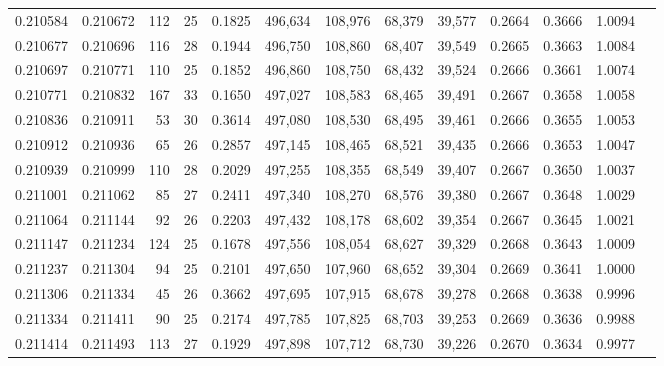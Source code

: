 \begin{tabular}{rrrrrrrrrrrrr}
0.210584 & 0.210672 & 112 &  25 &                                     0.1825 & 496,634 & 108,976 &  68,379 &  39,577 & 0.2664 & 0.3666 & 1.0094 \\
0.210677 & 0.210696 & 116 &  28 &                                     0.1944 & 496,750 & 108,860 &  68,407 &  39,549 & 0.2665 & 0.3663 & 1.0084 \\
0.210697 & 0.210771 & 110 &  25 &                                     0.1852 & 496,860 & 108,750 &  68,432 &  39,524 & 0.2666 & 0.3661 & 1.0074 \\
0.210771 & 0.210832 & 167 &  33 &                                     0.1650 & 497,027 & 108,583 &  68,465 &  39,491 & 0.2667 & 0.3658 & 1.0058 \\
0.210836 & 0.210911 &  53 &  30 &                                     0.3614 & 497,080 & 108,530 &  68,495 &  39,461 & 0.2666 & 0.3655 & 1.0053 \\
0.210912 & 0.210936 &  65 &  26 &                                     0.2857 & 497,145 & 108,465 &  68,521 &  39,435 & 0.2666 & 0.3653 & 1.0047 \\
0.210939 & 0.210999 & 110 &  28 &                                     0.2029 & 497,255 & 108,355 &  68,549 &  39,407 & 0.2667 & 0.3650 & 1.0037 \\
0.211001 & 0.211062 &  85 &  27 &                                     0.2411 & 497,340 & 108,270 &  68,576 &  39,380 & 0.2667 & 0.3648 & 1.0029 \\
0.211064 & 0.211144 &  92 &  26 &                                     0.2203 & 497,432 & 108,178 &  68,602 &  39,354 & 0.2667 & 0.3645 & 1.0021 \\
0.211147 & 0.211234 & 124 &  25 &                                     0.1678 & 497,556 & 108,054 &  68,627 &  39,329 & 0.2668 & 0.3643 & 1.0009 \\
0.211237 & 0.211304 &  94 &  25 &                                     0.2101 & 497,650 & 107,960 &  68,652 &  39,304 & 0.2669 & 0.3641 & 1.0000 \\
0.211306 & 0.211334 &  45 &  26 &                                     0.3662 & 497,695 & 107,915 &  68,678 &  39,278 & 0.2668 & 0.3638 & 0.9996 \\
0.211334 & 0.211411 &  90 &  25 &                                     0.2174 & 497,785 & 107,825 &  68,703 &  39,253 & 0.2669 & 0.3636 & 0.9988 \\
0.211414 & 0.211493 & 113 &  27 &                                     0.1929 & 497,898 & 107,712 &  68,730 &  39,226 & 0.2670 & 0.3634 & 0.9977 \\

\end{tabular}
